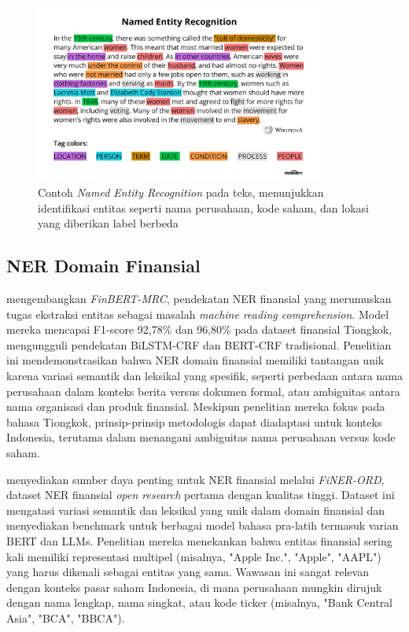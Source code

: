 \begin{figure}[H]
  \centering
  \includegraphics[width=0.85\textwidth]{image/ner-example.png}
  \caption{Contoh \textit{Named Entity Recognition} pada teks, menunjukkan identifikasi entitas seperti nama perusahaan, kode saham, dan lokasi yang diberikan label berbeda}
  \label{fig:ner-example}
\end{figure}

\subsection{NER Domain Finansial}

\textcite{zhang2022finbert} mengembangkan \textit{FinBERT-MRC}, pendekatan NER finansial yang merumuskan tugas ekstraksi entitas sebagai masalah \textit{machine reading comprehension}. Model mereka mencapai F1-score 92,78\% dan 96,80\% pada dataset finansial Tiongkok, mengungguli pendekatan BiLSTM-CRF dan BERT-CRF tradisional. Penelitian ini mendemonstrasikan bahwa NER domain finansial memiliki tantangan unik karena variasi semantik dan leksikal yang spesifik, seperti perbedaan antara nama perusahaan dalam konteks berita versus dokumen formal, atau ambiguitas antara nama organisasi dan produk finansial. Meskipun penelitian mereka fokus pada bahasa Tiongkok, prinsip-prinsip metodologis dapat diadaptasi untuk konteks Indonesia, terutama dalam menangani ambiguitas nama perusahaan versus kode saham.

\textcite{shah2023} menyediakan sumber daya penting untuk NER finansial melalui \textit{FiNER-ORD}, dataset NER finansial \textit{open research} pertama dengan kualitas tinggi. Dataset ini mengatasi variasi semantik dan leksikal yang unik dalam domain finansial dan menyediakan benchmark untuk berbagai model bahasa pra-latih termasuk varian BERT dan LLMs. Penelitian mereka menekankan bahwa entitas finansial sering kali memiliki representasi multipel (misalnya, "Apple Inc.", "Apple", "AAPL") yang harus dikenali sebagai entitas yang sama. Wawasan ini sangat relevan dengan konteks pasar saham Indonesia, di mana perusahaan mungkin dirujuk dengan nama lengkap, nama singkat, atau kode ticker (misalnya, "Bank Central Asia", "BCA", "BBCA").

